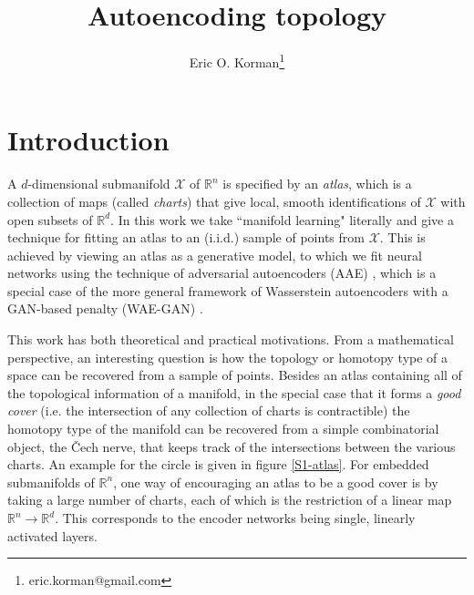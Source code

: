 \documentclass[reqno,11pt]{article}
\title{Autoencoding topology}
\author{Eric O. Korman\thanks{eric.korman@gmail.com}}
\date{\vspace{-4ex}}
\newcommand{\X}{\mathcal{X}}
\newcommand{\R}{\mathbb{R}}
\begin{document}
\maketitle
{}

\section{Introduction}
A $d$-dimensional submanifold $\X$ of $\R^n$ is specified by an \textit{atlas}, which is a collection of maps (called \textit{charts}) that give local, smooth identifications of $\X$ with open subsets of $\R^d$.  In this work we take ``manifold learning" literally and give a technique for fitting an atlas to an (i.i.d.) sample of points from $\X$. This is achieved by viewing an atlas as a generative model, to which we fit neural networks using the technique of adversarial autoencoders (AAE) \cite{AAE}, which is a special case of the more general framework of Wasserstein autoencoders with a GAN-based penalty (WAE-GAN) \cite{WAE}.

This work has both theoretical and practical motivations.  From a mathematical perspective, an interesting question is how the topology or homotopy type of a space can be recovered from a sample of points. Besides an atlas containing all of the topological information of a manifold, in the special case that it forms a \textit{good cover} (i.e. the intersection of any collection of charts is contractible) the homotopy type of the manifold can be recovered from a simple combinatorial object, the \v Cech nerve, that keeps track of the intersections between the various charts. An example for the circle is given in figure \ref{S1-atlas}. For embedded submanifolds of $\R^n$, one way of encouraging an atlas to be a good cover is by taking a large number of charts, each of which is the restriction of a linear map $\R^n \to \R^d$. This corresponds to the encoder networks being single, linearly activated layers.
\end{document}
